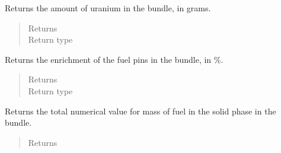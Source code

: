 \documentclass[letterpaper,10pt,openany,oneside,english]{sphinxmanual}
\begin{document}
\begin{fulllineitems}

\begin{fulllineitems}
\label{\detokenize{support_rst/fuel_bundle:fuel_bundle.FuelBundle.fresh_u_mass}}
Returns the amount of uranium in the bundle, in grams.
\begin{quote}\begin{description}
\item[{Returns}] \leavevmode
{}

\item[{Return type}] \leavevmode
{}

\end{description}\end{quote}

\end{fulllineitems}


\begin{fulllineitems}
\label{\detokenize{support_rst/fuel_bundle:fuel_bundle.FuelBundle.fuel_enrichment}}
Returns the enrichment of the fuel pins in the bundle, in \%.
\begin{quote}\begin{description}
\item[{Returns}] \leavevmode
{}

\item[{Return type}] \leavevmode
{}

\end{description}\end{quote}

\end{fulllineitems}


\begin{fulllineitems}
\label{\detokenize{support_rst/fuel_bundle:fuel_bundle.FuelBundle.fuel_mass}}
Returns the total numerical value for  mass of fuel in the solid phase
in the bundle.
\begin{quote}\begin{description}
\item[{Returns}] \leavevmode
{}


\end{description}
\end{quote}
\end{fulllineitems}
\end{fulllineitems}
\end{document}
